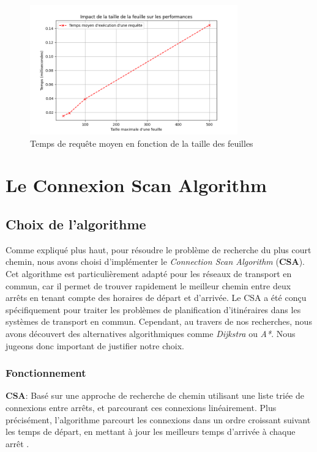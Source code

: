 \documentclass[12pt]{article}
\begin{document}
\begin{figure}[h]
    \centering
    \includegraphics[width=0.8\textwidth]{images/average-query-time.png}
    \caption{Temps de requête moyen en fonction de la taille des feuilles}
\end{figure}


\newpage
\section{Le Connexion Scan Algorithm}
\subsection{Choix de l'algorithme}
Comme expliqué plus haut, pour résoudre le problème de recherche du plus court chemin, nous avons choisi d'implémenter le \emph{Connection Scan Algorithm} (\textbf{CSA}).
Cet algorithme est particulièrement adapté pour les réseaux de transport en commun, car il permet de trouver rapidement le meilleur chemin
entre deux arrêts en tenant compte des horaires de départ et d'arrivée. Le CSA a été conçu spécifiquement pour traiter les problèmes de planification d'itinéraires 
dans les systèmes de transport en commun. Cependant, au travers de nos recherches, nous avons découvert des alternatives algorithmiques comme \emph{Dijkstra} ou \emph{A*}.
Nous jugeons donc important de justifier notre choix.

\subsubsection{Fonctionnement}
\textbf{CSA}: Basé sur une approche de recherche de chemin utilisant une liste triée de connexions entre arrêts, et parcourant ces connexions linéairement.
Plus précisément, l'algorithme parcourt les connexions dans un ordre croissant suivant les temps de départ, en mettant à jour les meilleurs temps d'arrivée à 
chaque arrêt  \cite{dibbelt2017connection}.
\end{document}
